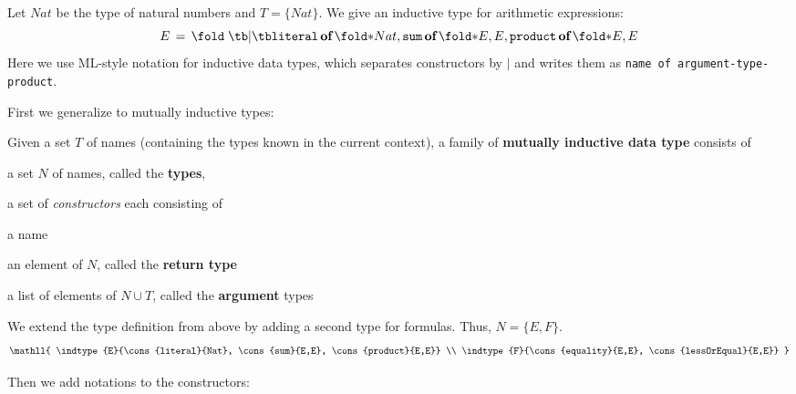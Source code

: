\begin{example}
Let $Nat$ be the type of natural numbers and $T=\{Nat\}$.
We give an inductive type for arithmetic expressions:
\[
\indtype{E}{\cons{literal}{Nat}, \cons{sum}{E,E}, \cons{product}{E,E}} \\
\]
Here we use ML-style notation for inductive data types, which separates constructors by $|$ and writes them as \texttt{name of argument-type-product}.
\end{example}

First we generalize to mutually inductive types:

\begin{definition}
Given a set $T$ of names (containing the types known in the current context), a family of \textbf{mutually inductive data type} consists of
\begin{compactitem}
 \item a set $N$ of names, called the \textbf{types},
 \item a set of \emph{constructors} each consisting of
 \begin{compactitem}
  \item a name
  \item an element of $N$, called the \textbf{return type}
  \item a list of elements of $N\cup T$, called the \textbf{argument} types
 \end{compactitem} 
\end{compactitem}
\end{definition}

\begin{example}
We extend the type definition from above by adding a second type for formulas.
Thus, $N=\{E,F\}$.
\[\mathll{
\indtype{E}{\cons{literal}{Nat}, \cons{sum}{E,E}, \cons{product}{E,E}} \\
\indtype{F}{\cons{equality}{E,E}, \cons{lessOrEqual}{E,E}}
}\]
\end{example}


Then we add notations to the constructors:

